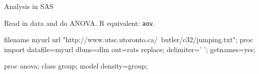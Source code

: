 \documentclass[unknownkeysallowed]{beamer}\usepackage[]{graphicx}\usepackage[]{color}
\begin{document}

\begin{frame}[fragile]{Analysis in SAS}

Read in data and do ANOVA. R equivalent: \texttt{aov}.

\begin{Datastep}
filename myurl url 
  "http://www.utsc.utoronto.ca/~butler/c32/jumping.txt";  
proc import
  datafile=myurl
    dbms=dlm
    out=rats
    replace;
  delimiter=' ';
  getnames=yes;
\end{Datastep}


\begin{Sascode}[store=ih]
proc anova;
  class group;
  model density=group;
\end{Sascode}

  
\end{frame}
\end{document}
